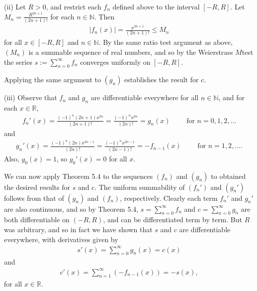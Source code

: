 \documentclass[letterpaper,10pt,english]{jupyterBook}
\begin{document}
\sphinxAtStartPar
(ii) Let \(R>0\), and restrict each \(f_n\) defined above to the interval \([-R,R]\). Let \(M_n=\frac{R^{2n+1}}{(2n+1)!}\) for each \(n\in\mathbb{N}\). Then
\begin{equation*}
\begin{split}
|f_n(x)| = \frac{x^{2n+1}}{(2n+1)!} \leq M_n
\end{split}
\end{equation*}
\sphinxAtStartPar
for all \(x\in[-R,R]\) and \(n\in\mathbb{N}\). By the same ratio test argument as above, \((M_n)\) is a summable sequence of real numbers, and so by the Weierstrass \(M\)\sphinxhyphen{}test the series \(s:=\sum_{n=0}^\infty f_n\) converges uniformly on \([-R,R]\).

Applying the same argument to \((g_n)\) establishes the result for \(c\).

\sphinxAtStartPar
(iii) Observe that \(f_n\) and \(g_n\) are differentiable everywhere for all \(n\in\mathbb{N}\), and for each \(x\in\mathbb{R}\),
\begin{equation*}
\begin{split}
f_n'(x) = \frac{(-1)^n(2n+1)x^{2n}}{(2n+1)!}=\frac{(-1)^nx^{2n}}{(2n)!}=g_n(x) \hspace{2em} \text{ for } n=0,1,2,\ldots
\end{split}
\end{equation*}
\sphinxAtStartPar
and
\begin{equation*}
\begin{split}
g_n'(x) = \frac{(-1)^n(2n)x^{2n-1}}{(2n)!} = \frac{(-1)^nx^{2n-1}}{(2n-1)!} = -f_{n-1}(x) \hspace{2em} \text{ for } n=1,2,\ldots.
\end{split}
\end{equation*}
\sphinxAtStartPar
Also, \(g_0(x)=1\), so \(g_0'(x)=0\) for all \(x\).

We can now apply Theorem 5.4 to the sequences \((f_n)\) and \((g_n)\) to obtained the desired results for \(s\) and \(c\). The uniform summability of \((f_n')\) and \((g_n')\) follows from that of \((g_n)\) and \((f_n)\), respectively. Clearly each term \(f_n'\) and \(g_n'\) are also continuous, and so by Theorem 5.4, \(s=\sum_{n=0}^\infty f_n\) and \(c=\sum_{n=0}^\infty g_n\) are both differentiable on \((-R,R)\), and can be differentiated term by term. But \(R\) was arbitrary, and so in fact we have shown that \(s\) and \(c\) are differentiable everywhere, with derivatives given by
\begin{equation*}
\begin{split}
s'(x) = \sum_{n=0}^\infty g_n(x) = c(x)
\end{split}
\end{equation*}
\sphinxAtStartPar
and
\begin{equation*}
\begin{split}
c'(x) = \sum_{n=1}^\infty (-f_{n-1}(x)) = -s(x),
\end{split}
\end{equation*}
\sphinxAtStartPar
for all \(x\in\mathbb{R}\).
\end{document}
